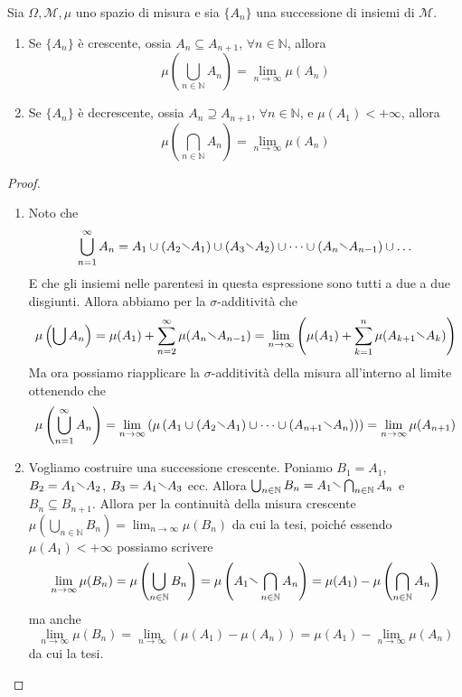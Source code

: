 \begin{theorem}\label{thm:cont_misura}
    Sia \(\Omega, \mathcal{M}, \mu\) uno spazio di misura e sia \(\{A_{n}\} \)
    una successione di insiemi di \(\mathcal{M}\).
\begin{enumerate}[label = \arabic*.]
    \item Se \(\{A_{n}\} \) è crescente, ossia \(A_{n} \subseteq A_{n+1}\),
        \(\forall n \in \mathbb{N}\), allora 
        \[
            \mu\left(\bigcup_{n \in \mathbb{N}} A_{n}\right) = \lim_{n \to
            \infty} \mu(A_{n})
        \]
    \item Se \(\{A_{n}\} \) è decrescente, ossia \(A_{n} \supseteq A_{n+1}\),
        \(\forall n \in \mathbb{N}\), e \(\mu(A_{1}) < +\infty\), allora
        \[
            \mu\left(\bigcap_{n \in \mathbb{N}} A_{n}\right) = \lim_{n \to
            \infty} \mu(A_{n})
        \]
\end{enumerate}
\end{theorem}
\begin{proof}
\begin{enumerate}[label = \arabic*.]
    \item Noto che \[\bigcup_{n=1}^{\infty} A_{n} = A_{1} \cup (A_{2}\sminus
        A_{1}) \cup (A_{3}\sminus A_{2}) \cup \dots \cup (A_{n} \sminus A_{n-1})
        \cup \dots\] 
        E che gli insiemi nelle parentesi in questa espressione sono tutti a due
        a due disgiunti. Allora abbiamo per la \(\sigma\)-additività che
        \[
            \mu\left(\bigcup A_{n}\right) = \mu(A_{1}) +
            \sum_{n=2}^{\infty} \mu(A_{n} \sminus A_{n-1}) = \lim_{n \to
            \infty} \left( \mu(A_{1}) + \sum_{k=1}^{n} \mu(A_{k+1} \sminus A_k)  \right) 
        \]
        Ma ora possiamo riapplicare la \(\sigma\)-additività della misura
        all'interno al limite ottenendo che 
        \[
            \mu \left( \bigcup_{n=1}^{\infty} A_{n}  \right) = \lim_{n \to
            \infty} \left( \mu\left( A_{1} \cup (A_{2}\sminus A_{1}) \cup \dots \cup
            (A_{n+1} \sminus A_{n}) \right)  \right) = \lim_{n \to \infty}
            \mu(A_{n+1})
        \]
    \item Vogliamo costruire una successione crescente. Poniamo \(B_{1} = A_{1}\),
        \(B_{2} = A_{1} \sminus A_{2}\), \(B_{3} = A_{1} \sminus A_{3}\) ecc.
        Allora \(\bigcup_{n \in \mathbb{N}} B_{n} = A_{1} \sminus \bigcap_{n
        \in \mathbb{N}} A_{n}\) e \(B_{n} \subseteq B_{n+1}\). Allora per la
        continuità della misura crescente \(\mu\left( \bigcup_{n \in \mathbb{N}}
        B_{n} \right) = \lim_{n \to \infty} \mu(B_{n}) \) da cui la tesi, poiché
        essendo \(\mu(A_{1}) < +\infty\) possiamo scrivere
        \[
            \lim_{n \to \infty} \mu(B_{n})=
            \mu\left( \bigcup_{n \in \mathbb{N}} B_{n}  \right) = \mu \left(
            A_{1} \sminus \bigcap_{n \in \mathbb{N}} A_{n} \right) = \mu(A_{1})
            - \mu\left( \bigcap_{n \in \mathbb{N}} A_{n} \right)
        \]
        ma anche 
        \[
            \lim_{n \to \infty} \mu(B_{n}) = \lim_{n \to \infty} \left(
            \mu(A_{1}) - \mu(A_{n}) \right) = \mu(A_{1}) - \lim_{n \to \infty}
            \mu(A_{n})
        \]
        da cui la tesi.
\end{enumerate}
\end{proof}
